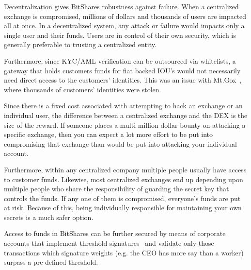 Decentralization gives BitShares robustness against failure. When a centralized
exchange is compromised, millions of dollars and thousands of users are
impacted all at once. In a decentralized system, any attack or failure would
impacts only a single user and their funds. Users are in control of their own
security, which is generally preferable to trusting a centralized entity.

Furthermore, since KYC/AML verification can be outsourced via whitelists, a
gateway that holds customers funds for fiat backed IOU's would not necessarily
need direct access to the customers' identities. This was an issue with
Mt.Gox~\cite{mtgox}, where thousands of customers' identities were stolen.

Since there is a fixed cost associated with attempting to hack an exchange or
an individual user, the difference between a centralized exchange and the DEX
is the size of the reward. If someone places a multi-million dollar bounty on
attacking a specific exchange, then you can expect a lot more effort to be put
into compromising that exchange than would be put into attacking your
individual account. 

Furthermore, within any centralized company multiple people usually have access
to customer funds. Likewise, most centralized exchanges end up depending upon
multiple people who share the responsibility of guarding the secret key that
controls the funds. If any one of them is compromised, everyone's funds are put
at risk. Because of this, being individually responsible for maintaining your
own secrets is a much safer option.

Access to funds in BitShares can be further secured by means of corporate
accounts that implement threshold signatures~\cite{bts:general,ripple:multisig}
and validate only those transactions which signature weights (e.g. the CEO has
more say than a worker) surpass a pre-defined threshold.
